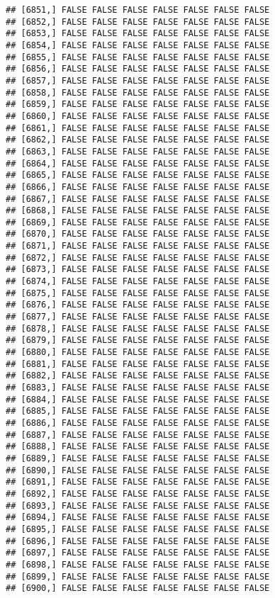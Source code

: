 \documentclass[
]{article}
\begin{document}
\begin{verbatim}
## [6851,] FALSE FALSE FALSE FALSE FALSE FALSE FALSE
## [6852,] FALSE FALSE FALSE FALSE FALSE FALSE FALSE
## [6853,] FALSE FALSE FALSE FALSE FALSE FALSE FALSE
## [6854,] FALSE FALSE FALSE FALSE FALSE FALSE FALSE
## [6855,] FALSE FALSE FALSE FALSE FALSE FALSE FALSE
## [6856,] FALSE FALSE FALSE FALSE FALSE FALSE FALSE
## [6857,] FALSE FALSE FALSE FALSE FALSE FALSE FALSE
## [6858,] FALSE FALSE FALSE FALSE FALSE FALSE FALSE
## [6859,] FALSE FALSE FALSE FALSE FALSE FALSE FALSE
## [6860,] FALSE FALSE FALSE FALSE FALSE FALSE FALSE
## [6861,] FALSE FALSE FALSE FALSE FALSE FALSE FALSE
## [6862,] FALSE FALSE FALSE FALSE FALSE FALSE FALSE
## [6863,] FALSE FALSE FALSE FALSE FALSE FALSE FALSE
## [6864,] FALSE FALSE FALSE FALSE FALSE FALSE FALSE
## [6865,] FALSE FALSE FALSE FALSE FALSE FALSE FALSE
## [6866,] FALSE FALSE FALSE FALSE FALSE FALSE FALSE
## [6867,] FALSE FALSE FALSE FALSE FALSE FALSE FALSE
## [6868,] FALSE FALSE FALSE FALSE FALSE FALSE FALSE
## [6869,] FALSE FALSE FALSE FALSE FALSE FALSE FALSE
## [6870,] FALSE FALSE FALSE FALSE FALSE FALSE FALSE
## [6871,] FALSE FALSE FALSE FALSE FALSE FALSE FALSE
## [6872,] FALSE FALSE FALSE FALSE FALSE FALSE FALSE
## [6873,] FALSE FALSE FALSE FALSE FALSE FALSE FALSE
## [6874,] FALSE FALSE FALSE FALSE FALSE FALSE FALSE
## [6875,] FALSE FALSE FALSE FALSE FALSE FALSE FALSE
## [6876,] FALSE FALSE FALSE FALSE FALSE FALSE FALSE
## [6877,] FALSE FALSE FALSE FALSE FALSE FALSE FALSE
## [6878,] FALSE FALSE FALSE FALSE FALSE FALSE FALSE
## [6879,] FALSE FALSE FALSE FALSE FALSE FALSE FALSE
## [6880,] FALSE FALSE FALSE FALSE FALSE FALSE FALSE
## [6881,] FALSE FALSE FALSE FALSE FALSE FALSE FALSE
## [6882,] FALSE FALSE FALSE FALSE FALSE FALSE FALSE
## [6883,] FALSE FALSE FALSE FALSE FALSE FALSE FALSE
## [6884,] FALSE FALSE FALSE FALSE FALSE FALSE FALSE
## [6885,] FALSE FALSE FALSE FALSE FALSE FALSE FALSE
## [6886,] FALSE FALSE FALSE FALSE FALSE FALSE FALSE
## [6887,] FALSE FALSE FALSE FALSE FALSE FALSE FALSE
## [6888,] FALSE FALSE FALSE FALSE FALSE FALSE FALSE
## [6889,] FALSE FALSE FALSE FALSE FALSE FALSE FALSE
## [6890,] FALSE FALSE FALSE FALSE FALSE FALSE FALSE
## [6891,] FALSE FALSE FALSE FALSE FALSE FALSE FALSE
## [6892,] FALSE FALSE FALSE FALSE FALSE FALSE FALSE
## [6893,] FALSE FALSE FALSE FALSE FALSE FALSE FALSE
## [6894,] FALSE FALSE FALSE FALSE FALSE FALSE FALSE
## [6895,] FALSE FALSE FALSE FALSE FALSE FALSE FALSE
## [6896,] FALSE FALSE FALSE FALSE FALSE FALSE FALSE
## [6897,] FALSE FALSE FALSE FALSE FALSE FALSE FALSE
## [6898,] FALSE FALSE FALSE FALSE FALSE FALSE FALSE
## [6899,] FALSE FALSE FALSE FALSE FALSE FALSE FALSE
## [6900,] FALSE FALSE FALSE FALSE FALSE FALSE FALSE

\end{verbatim}
\end{document}
